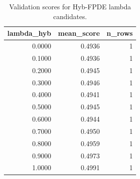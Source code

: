 \begin{table}[t]
\caption{Validation scores for Hyb-FPDE lambda candidates.}
\label{tab:lambda_distribution_computed}
\centering
\begin{tabular}{rrr}
\toprule
lambda\_hyb & mean\_score & n\_rows \\
\midrule
0.0000 & 0.4936 & 1 \\
0.1000 & 0.4936 & 1 \\
0.2000 & 0.4945 & 1 \\
0.3000 & 0.4946 & 1 \\
0.4000 & 0.4941 & 1 \\
0.5000 & 0.4945 & 1 \\
0.6000 & 0.4944 & 1 \\
0.7000 & 0.4950 & 1 \\
0.8000 & 0.4959 & 1 \\
0.9000 & 0.4973 & 1 \\
1.0000 & 0.4991 & 1 \\
\bottomrule
\end{tabular}

\end{table}
